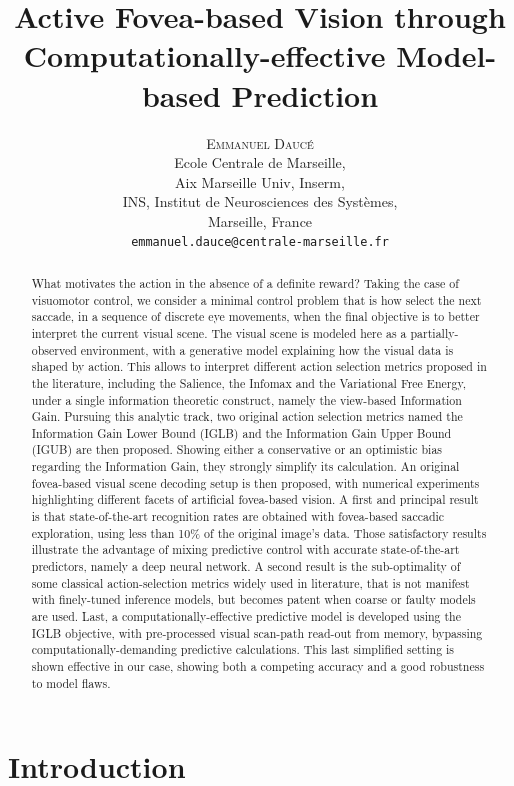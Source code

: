 \documentclass[12pt,twoside,openright]{article}
\title{\textbf{Active Fovea-based Vision through Computationally-effective Model-based Prediction}}
\author{\textsc{Emmanuel Daucé}\\
	Ecole Centrale de Marseille,\\ 
	Aix Marseille Univ, Inserm,\\ 
	INS, Institut de Neurosciences des Systèmes, \\
	Marseille, France\\
	\texttt{emmanuel.dauce@centrale-marseille.fr} 
}%
\date{}
\begin{document}
	
\maketitle
	
\begin{abstract}
What motivates the action in the absence of a definite reward? Taking the case of visuomotor control, we consider a minimal control problem that is how select the next saccade, in a sequence of discrete eye movements, when the final objective is to better interpret the current visual scene. The visual scene is modeled here as a partially-observed environment, with a generative model explaining how the visual data is shaped by action. This allows to interpret different action selection metrics proposed in the literature, including the Salience, the Infomax and the Variational Free Energy, under a single information theoretic construct, namely the view-based Information Gain. Pursuing this analytic track, two original action selection metrics named the Information Gain Lower Bound (IGLB) and the Information Gain Upper Bound (IGUB) are then proposed. Showing either a conservative or an optimistic bias regarding the Information Gain, they strongly simplify its calculation. An original fovea-based visual scene decoding setup is then proposed,
with numerical experiments highlighting different facets of artificial fovea-based vision. A first and principal result is that state-of-the-art recognition rates are obtained with fovea-based saccadic exploration, using less than 10\% of the original image's data. Those satisfactory results illustrate the advantage of mixing predictive control with accurate state-of-the-art predictors, namely a deep neural network. A second result is the sub-optimality of some classical action-selection metrics widely used in literature, that is not manifest with finely-tuned inference models, but becomes patent when coarse or faulty models are used. Last, a computationally-effective predictive model is developed using the IGLB objective, with pre-processed visual scan-path read-out from memory, bypassing computationally-demanding predictive calculations. This last simplified setting is shown effective in our case, showing both a competing accuracy and a good robustness to model flaws. 



\end{abstract}
\section{Introduction}
\end{document}
